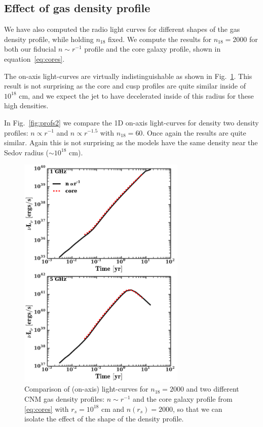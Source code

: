 \documentclass[usenatbib,fleqn]{mnras}
\begin{document}


\subsection{Effect of gas density profile}
\label{sec:profileComp}
We have also computed the radio light curves for different shapes of
the gas density profile, while holding $n_{18}$ fixed. We compute the
results for $n_{18}=2000$ for both our fiducial $n\sim r^{-1}$ profile and
the core galaxy profile, shown in equation~\eqref{eq:cores}. 

The on-axis light-curves are virtually indistinguishable as shown in
Fig.~\ref{fig:cores}. This result is not surprising as
the core and cusp profiles are quite similar inside of $10^{18}$ cm,
and we expect the jet to have decelerated inside of this radius for
these high densities. 

In Fig.~\ref{fig:profs2} we compare the 1D on-axis light-curves for
density two density profiles: $n\propto r^{-1}$ and $n\propto r^{-1.5}$
with $n_{18}=60$. Once again the results are quite similar. Again this
is not surprising as the models have the same density near the Sedov
radius ($\sim 10^{18}$ cm).  


\begin{figure} 
  \includegraphics[width=8cm]{fig_cores.pdf}
  \caption{\label{fig:cores} Comparison of (on-axis) light-curves for
    $n_{18}=2000$ and two different CNM gas density profiles: $n\sim
    r^{-1}$ and the core galaxy profile from \eqref{eq:cores} with
    $r_s=10^{18}$ cm and $n(r_s)=2000$, so that we can isolate the
    effect of the shape of the density profile.}
\end{figure}
\end{document}
